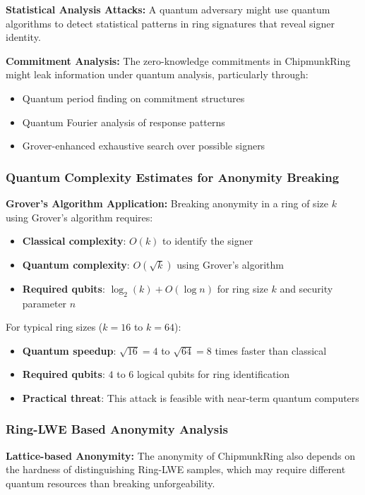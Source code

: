 \documentclass[11pt,a4paper]{article}
\begin{document}
\textbf{Statistical Analysis Attacks:} A quantum adversary might use quantum algorithms to detect statistical patterns in ring signatures that reveal signer identity.

\textbf{Commitment Analysis:} The zero-knowledge commitments in ChipmunkRing might leak information under quantum analysis, particularly through:
\begin{itemize}
\item Quantum period finding on commitment structures
\item Quantum Fourier analysis of response patterns  
\item Grover-enhanced exhaustive search over possible signers
\end{itemize}

\subsubsection{Quantum Complexity Estimates for Anonymity Breaking}

\textbf{Grover's Algorithm Application:} Breaking anonymity in a ring of size $k$ using Grover's algorithm requires:
\begin{itemize}
\item \textbf{Classical complexity}: $O(k)$ to identify the signer
\item \textbf{Quantum complexity}: $O(\sqrt{k})$ using Grover's algorithm
\item \textbf{Required qubits}: $\log_2(k) + O(\log n)$ for ring size $k$ and security parameter $n$
\end{itemize}

For typical ring sizes ($k = 16$ to $k = 64$):
\begin{itemize}
\item \textbf{Quantum speedup}: $\sqrt{16} = 4$ to $\sqrt{64} = 8$ times faster than classical
\item \textbf{Required qubits}: $4$ to $6$ logical qubits for ring identification
\item \textbf{Practical threat}: This attack is feasible with near-term quantum computers
\end{itemize}

\subsubsection{Ring-LWE Based Anonymity Analysis}

\textbf{Lattice-based Anonymity:} The anonymity of ChipmunkRing also depends on the hardness of distinguishing Ring-LWE samples, which may require different quantum resources than breaking unforgeability.
\end{document}
